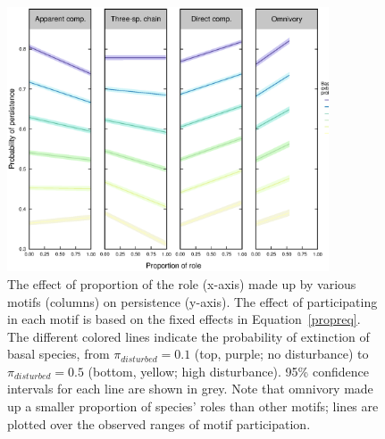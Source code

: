 \documentclass[12pt]{article}
\begin{document}
\begin{spacing}{2.0}
    
        \begin{figure}[hb!]
        \centering
        \includegraphics[width=0.85\textwidth]{figures/persistence_vs_motifs.eps}
        \caption{The effect of proportion of the role (x-axis) made up by various motifs (columns) on persistence (y-axis). The effect of participating in each motif is based on the fixed effects in Equation~\ref{propreq}. The different colored lines indicate the probability of extinction of basal species, from $\pi_{disturbed} = 0.1$ (top, purple; no disturbance) to $\pi_{disturbed} = 0.5$ (bottom, yellow; high disturbance). 95\% confidence intervals for each line are shown in grey. Note that omnivory made up a smaller proportion of species' roles than other motifs; lines are plotted over the observed ranges of motif participation.}
    \label{fig:prop_lmer_all}
    \end{figure}
        


\end{spacing}
\end{document}
